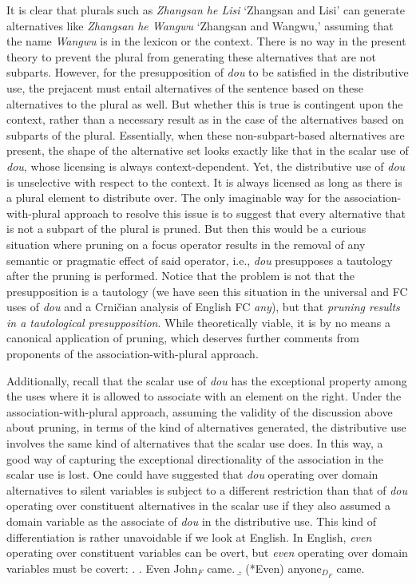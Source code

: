 \documentclass[12pt]{article}
\begin{document}
It is clear that plurals such as \emph{Zhangsan he Lisi} `Zhangsan and Lisi' can generate alternatives like \emph{Zhangsan he Wangwu} `Zhangsan and Wangwu,' assuming that the name \emph{Wangwu} is in the lexicon or the context.
There is no way in the present theory to prevent the plural from generating these alternatives that are not subparts.
However, for the presupposition of \emph{dou} to be satisfied in the distributive use, the prejacent must entail alternatives of the sentence based on these alternatives to the plural as well.
But whether this is true is contingent upon the context, rather than a necessary result as in the case of the alternatives based on subparts of the plural.
Essentially, when these non-subpart-based alternatives are present, the shape of the alternative set looks exactly like that in the scalar use of \emph{dou}, whose licensing is always context-dependent.
Yet, the distributive use of \emph{dou} is unselective with respect to the context.
It is always licensed as long as there is a plural element to distribute over.
The only imaginable way for the association-with-plural approach to resolve this issue is to suggest that every alternative that is not a subpart of the plural is pruned.
But then this would be a curious situation where pruning on a focus operator results in the removal of any semantic or pragmatic effect of said operator, i.e., \emph{dou} presupposes a tautology after the pruning is performed.
Notice that the problem is not that the presupposition is a tautology (we have seen this situation in the universal and FC uses of \emph{dou} and a Crni\v{c}ian analysis of English FC \emph{any}), but that \emph{pruning results in a tautological presupposition}.
While theoretically viable, it is by no means a canonical application of pruning, which deserves further comments from proponents of the association-with-plural approach.

Additionally, recall that the scalar use of \emph{dou} has the exceptional property among the uses where it is allowed to associate with an element on the right.
Under the association-with-plural approach, assuming the validity of the discussion above about pruning, in terms of the kind of alternatives generated, the distributive use involves the same kind of alternatives that the scalar use does.
In this way, a good way of capturing the exceptional directionality of the association in the scalar use is lost.
One could have suggested that \emph{dou} operating over domain alternatives to silent variables is subject to a different restriction than that of \emph{dou} operating over constituent alternatives in the scalar use if they also assumed a domain variable as the associate of \emph{dou} in the distributive use.
This kind of differentiation is rather unavoidable if we look at English.
In English, \emph{even} operating over constituent variables can be overt, but \emph{even} operating over domain variables must be covert:
\ex. \a. Even John\(_F\) came.
\b. (*Even) anyone\(_{D_F}\) came.
\end{document}
